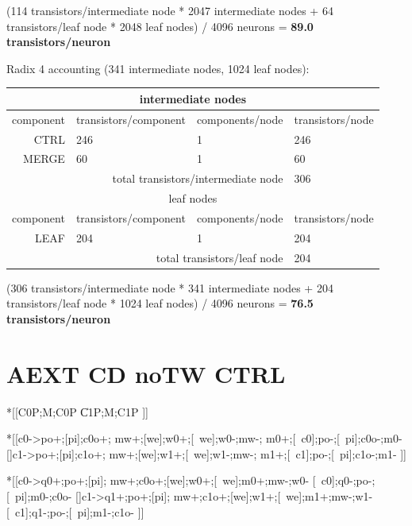 \documentclass{article}
\begin{document}
(114 transistors/intermediate node * 2047 intermediate nodes + 64 transistors/leaf node * 2048 leaf nodes) / 4096 neurons = \textbf{89.0 transistors/neuron}

\noindent
Radix 4 accounting (341 intermediate nodes, 1024 leaf nodes):

\begin{center}
    \begin{tabular}{|r|l|l|l|}
    \hline \multicolumn{4}{|c|}{intermediate nodes} \\ \hline
    component & transistors/component & components/node & transistors/node \\ \hline
    CTRL & 246 & 1 & 246 \\ \hline
    MERGE & 60 & 1 & 60 \\ \hline
    \hline \multicolumn{3}{|r|}{total transistors/intermediate node} & 306 \\ \hline
    \hline \multicolumn{4}{|c|}{leaf nodes} \\ \hline
    component & transistors/component & components/node & transistors/node \\ \hline
    LEAF & 204 & 1 & 204 \\ \hline
    \hline \multicolumn{3}{|r|}{total transistors/leaf node} & 204 \\ \hline
    \end{tabular}
\end{center}

(306 transistors/intermediate node * 341 intermediate nodes + 204 transistors/leaf node * 1024 leaf nodes) / 4096 neurons = \textbf{76.5 transistors/neuron}

\section{AEXT CD noTW CTRL \label{sec:AEXT_CD_noTW_CTRL}}

\begin{csp}
*[[C0\*P;M;C0\*P
  \|C1\*P;M;C1\*P
 ]]
\end{csp}

\begin{hse} %
*[[c0->po+;[pi];c0o+;
       mw+;[we];w0+;[~we];w0-;mw-;
       m0+;[~c0];po-;[~pi];c0o-;m0-
 []c1->po+;[pi];c1o+;
       mw+;[we];w1+;[~we];w1-;mw-;
       m1+;[~c1];po-;[~pi];c1o-;m1-
 ]]
\end{hse}

\begin{hse} %
*[[c0->q0+;po+;[pi];
       mw+;c0o+;[we];w0+;[~we];m0+;mw-;w0-
       [~c0];q0-;po-;[~pi];m0-;c0o-
 []c1->q1+;po+;[pi];
       mw+;c1o+;[we];w1+;[~we];m1+;mw-;w1-
       [~c1];q1-;po-;[~pi];m1-;c1o-
 ]]
\end{hse}
\end{document}
